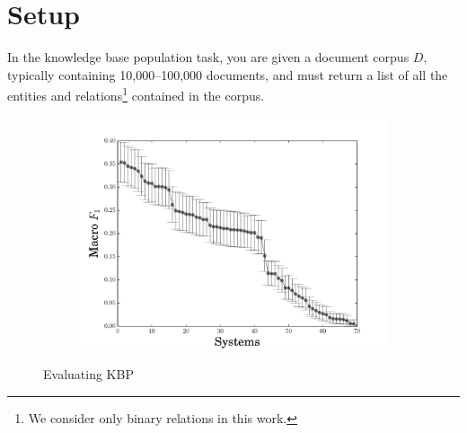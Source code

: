 \section{Setup}
\label{sec:setup}



In the knowledge base population task, 
 you are given a document corpus $D$, typically containing 10,000--100,000 documents,
 and must return a list of all the entities and relations\footnote{
 We consider only binary relations in this work.
 } contained in the corpus.

\begin{figure}
  \centering
  \begin{subfigure}{0.49\textwidth}
  \includegraphics[width=\columnwidth]{figures/experiment1}
  \end{subfigure}
  \begin{subfigure}{0.49\textwidth}
  
  \end{subfigure}
  \caption{Evaluating KBP}
\end{figure}

